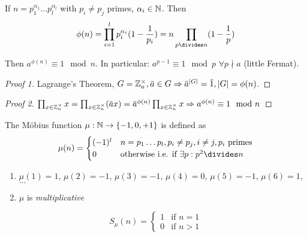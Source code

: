 \documentclass[NumTh.tex]{subfiles}
\begin{document}
\begin{prop}
  If $n = p_1^{\alpha_1} \dots p_l^{\alpha_l}$ with $p_i \neq p_j$ primes, $\alpha_i \in \mathbb{N}$.
  Then
  \[ \phi(n) = \prod_{i=1}^l p_i^{\alpha_i} (1 - \frac{1}{p_i}) = n \prod_{p\divides n} (1 - \frac{1}{p}) \]
\end{prop}

\begin{theorem}
  Then $a^{\phi(n)} \equiv 1 \mod n$.
  In particular: $a^{p-1} \equiv 1 \mod p$ $\forall p \nmid a$ (little Fermat).
\end{theorem}

\begin{proof}[Proof 1]
  Lagrange's Theorem, $G = \Z_n^\times, \overbar{a} \in G \Rightarrow \overbar{a}^{|G|} = \overbar{1}, |G| = \phi(n)$.
\end{proof}

\begin{proof}[Proof 2]
  $\prod_{x \in \Z_n^\times} x = \prod_{x \in \Z_n^\times} (\overbar{a}x) = \overbar{a}^{\phi(n)} \prod_{x \in \Z_n^\times} x \Rightarrow a^{\phi(n)} \equiv 1 \mod n$ 
\end{proof}

\begin{defi}
  The Möbius function $\mu: \mathbb{N} \to \{-1,0,+1\}$ is defined as
  \[
	\mu(n) = \begin{cases}
	  (-1)^l & n = p_1 \dots p_l, p_i \neq p_j, i \neq j, p_i \text{ primes} \\
	  0       & \text{otherwise i.e. if } \exists p: p^2 \divides n
	\end{cases}
  \]
\end{defi}

\begin{rem}\hfill
  \begin{enumerate}
    \item $\mu(1) = 1$, $\mu(2) = -1$, $\mu(3) = -1$, $\mu(4) = 0$, $\mu(5) = -1$, $\mu(6) = 1$, $\dots$
    \item $\mu$ is \emph{multiplicative}
  \end{enumerate}
\end{rem}

\begin{lemma}
  \[
    S_\mu(n) = \begin{cases}
      1 & \text{if } n=1 \\
      0 & \text{if } n>1
    \end{cases}
  \]
\end{lemma}
\end{document}
